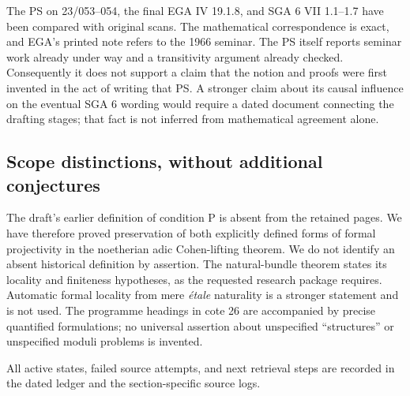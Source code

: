 The PS on 23/053--054, the final EGA IV 19.1.8, and SGA 6 VII
1.1--1.7 have been compared with original scans. The mathematical
correspondence is exact, and EGA's printed note refers to the 1966
seminar. The PS itself reports seminar work already under way and a
transitivity argument already checked. Consequently it does not
support a claim that the notion and proofs were first invented in
the act of writing that PS. A stronger claim about its causal
influence on the eventual SGA 6 wording would require a dated
document connecting the drafting stages; that fact is not inferred
from mathematical agreement alone.

\subsection{Scope distinctions, without additional conjectures}

The draft's earlier definition of condition P is absent from the retained
pages. We have therefore proved preservation of both explicitly defined
forms of formal projectivity in the noetherian adic Cohen-lifting theorem.
We do not identify an absent historical definition by assertion.
The natural-bundle theorem states its locality and finiteness hypotheses,
as the requested research package requires. Automatic formal locality
from mere \emph{\'etale} naturality is a stronger statement and is not
used. The programme headings in cote 26 are accompanied by precise
quantified formulations; no universal assertion about unspecified
``structures'' or unspecified moduli problems is invented.

All active states, failed source attempts, and next retrieval steps are
recorded in the dated ledger and the section-specific source logs.
